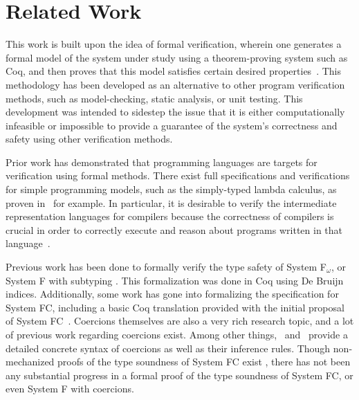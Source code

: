 \documentclass{sig-alternate}
\begin{document}
\section{Related Work}
\label{sec:related-work}
This work is built upon the idea of formal verification, wherein one generates a formal
model of the system under study using a theorem-proving system such as Coq, and then proves 
that this model satisfies certain desired properties~\cite{series/natosec/CousotC10}. This 
methodology has been developed as an alternative to other program verification methods, such as 
model-checking, static analysis, or unit testing. This development was intended to sidestep the 
issue that it is either computationally infeasible or impossible to provide a guarantee of the 
system's correctness and safety using other verification methods.

Prior work has demonstrated that programming languages are targets for verification using 
formal methods. There exist full specifications and verifications for simple programming
models, such as the simply-typed lambda calculus, as proven in~\cite{Pierce:SF} for example. In particular, it is desirable to verify the intermediate representation languages for compilers because the correctness of compilers is crucial in order to correctly execute and reason about programs written in that language~\cite{Zhao:2012:FLI:2103656.2103709}.

Previous work has been done to formally verify the type safety of System F$_\omega$, or System F with subtyping \cite{Vouillon12}. This formalization was done in Coq using De Bruijn indices. Additionally, some work has gone into formalizing the specification for System FC, including a basic 
Coq translation provided with the initial proposal of System FC~\cite{conf/tldi/SulzmannCJD07}. Coercions themselves are also a very rich research topic, and a lot of previous work regarding coercions exist. Among other things,~\cite{Breitner:2014:SZC:2628136.2628141} and~\cite{DBLP:conf/tldi/YorgeyWCJVM12} provide a detailed concrete syntax of coercions as well as their inference rules.
Though non-mechanized proofs of the type soundness of System FC exist \cite{conf/tldi/SulzmannCJD07}, there has not been any substantial progress in a formal proof of the type soundness of System FC, or even System F with coercions.
\end{document}
